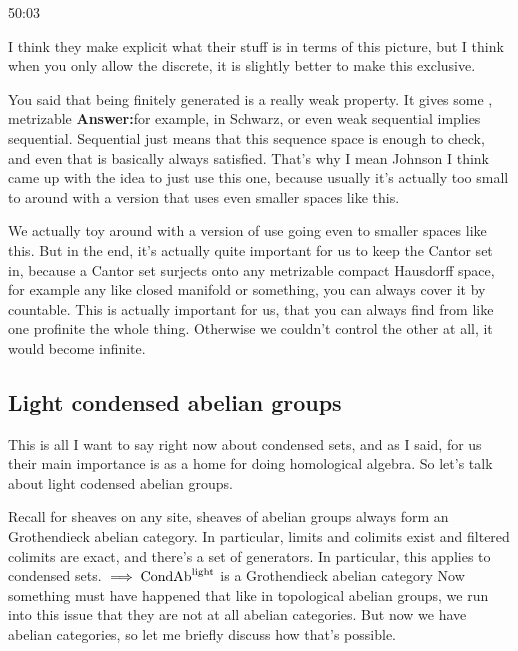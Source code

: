 \begin{unfinished}{50:03}
\begin{remark}
I think they make explicit what their stuff is in terms of this picture, but I think when you only allow the discrete, it is slightly better to make this exclusive.

You said that being finitely generated is a really weak property. It gives some , 
metrizable
\textbf{Answer:}for example, in Schwarz, or even weak sequential implies sequential. Sequential just means that this sequence space is enough to check, and even that is basically always satisfied. That's why I mean Johnson I think came up with the idea to just use this one, because usually it's actually too small to around with a version that uses even smaller spaces like this.

We actually toy around with a version of use going even to smaller spaces like this. But in the end, it's actually quite important for us to keep the Cantor set in, because a Cantor set surjects onto any metrizable compact Hausdorff space, for example any like closed manifold or something, you can always cover it by countable. This is actually important for us, that you can always find from like one profinite the whole thing. Otherwise we couldn't control the other at all, it would become infinite.

\subsection{Light condensed abelian groups} \label{subsec:light_condensed_abelian_groups}

This is all I want to say right now about condensed sets, and as I said, for us their main importance is as a home for doing homological algebra. So let's talk about light codensed abelian groups.

Recall for sheaves on any site, sheaves of abelian groups always form an Grothendieck abelian category. In particular, limits and colimits exist and filtered colimits are exact, and there's a set of generators. 
In particular, this applies to condensed sets.
$\implies \mathrm{Cond}\mathrm{Ab}^{\mathrm{light}}$ is a Grothendieck abelian category
Now something must have happened that like in topological abelian groups, we run into this issue that they are not at all abelian categories. But now we have abelian categories, so let me briefly discuss how that's possible.


\end{remark}
\end{unfinished}

